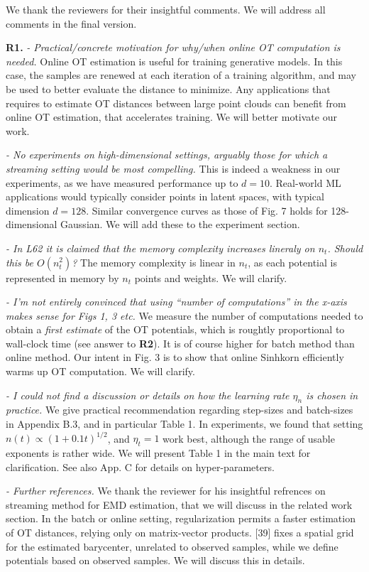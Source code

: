 \documentclass{article}
\begin{document}
We thank the reviewers for their insightful comments. We will address all comments in the final version.

\textbf{R1.} \textit{- Practical/concrete motivation for why/when online OT computation is needed.} Online OT estimation is useful for training generative models. In this case, the samples are renewed at each iteration of a training algorithm, and may be used to better evaluate the distance to minimize. Any applications that requires to estimate OT distances between large point clouds can benefit from online OT estimation, that accelerates training. We will better motivate our work.

\textit{- No experiments on high-dimensional settings, arguably those for which a streaming setting would be most compelling.} This is indeed a weakness in our experiments, as we have measured performance up to $d=10$. Real-world ML applications would typically consider points in latent spaces, with typical dimension $d=128$. Similar convergence curves as those of Fig. 7 holds for 128-dimensional Gaussian. We will add these to the experiment section.

\textit{- In L62 it is claimed that the memory complexity increases lineraly on $n_t$. Should this be $O(n_t^2)$?} The memory complexity is linear in $n_t$, as each potential is represented in memory by $n_t$ points and weights. We will clarify.

\textit{- I’m not entirely convinced that using “number of computations” in the x-axis makes sense for Figs 1, 3 etc.} We measure the number of computations needed to obtain a \textit{first estimate} of the OT potentials, which is roughtly proportional to wall-clock time (see answer to \textbf{R2}). It is of course higher for batch method than online method. Our intent in Fig. 3 is to show that online Sinhkorn efficiently warms up OT computation. We will clarify.

\textit{- I could not find a discussion or details on how the learning rate $\eta_n$ is chosen in practice.} We give practical recommendation regarding step-sizes and batch-sizes in Appendix B.3, and in particular Table 1. In experiments, we found that setting $n(t) \propto (1 + 0.1t)^{1/2}$, and $\eta_t = 1$ work best, although the range of usable exponents is rather wide. We will present Table 1 in the main text for clarification. See also App. C for details on hyper-parameters.

\textit{- Further references.} We thank the reviewer for his insightful refrences on streaming method for EMD estimation, that we will discuss in the related work section. In the batch or online setting, regularization permits a faster estimation of OT distances, relying only on matrix-vector products. [39] fixes a spatial grid for the estimated barycenter, unrelated to observed samples, while we define potentials based on observed samples. We will discuss this in details.
\end{document}
